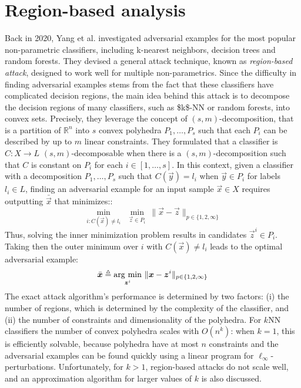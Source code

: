 \section {Region-based analysis}
\label{sec:region-analysis}

Back in 2020, Yang et al. \cite{YangRWC20} investigated adversarial examples for the most popular non-parametric classifiers, including k-nearest neighbors, decision trees and random forests. They devised a general attack technique, known as \emph{region-based attack}, designed to work well for multiple non-parametrics. Since the difficulty in finding adversarial examples stems from the fact that these classifiers have complicated decision regions, the main idea behind this attack is to decompose the decision regions of many classifiers, such as \acs{$k$-NN} or random forests, into convex sets. Precisely, they leverage the concept of $(s, m)$-decomposition, that is a partition of $\mathbb{R}^n$ into $s$ convex polyhedra $P_1,\dots,P_s$ such that each $P_i$ can be described by up to $m$ linear constraints. They formulated  that a classifier is $C\colon X \rightarrow L$ $(s, m)$-decomposable when there is a $(s, m)$-decomposition such that $C$ is constant on $P_i$ for each $i \in [1,\dots,s]$. In this context, given a classifier with a decomposition  $P_1,\dots,P_s$ such that $C(\vec{y}) = l_i$ when $\vec{y} \in P_i$ for labels $l_i \in L$, finding an adversarial example for an input sample $\vec{x} \in X$ requires outputting $\bar{\vec{x}}$ that minimizes::
\begin{equation*}
	\min\limits_{i\colon C(\vec{x}) \neq l_i} ~~ \min\limits_{\vec{z} \in P_i} ~ \lVert \vec{x} - \vec{z} \rVert_{p \in \{1, 2, \infty\}}
\end{equation*}
Thus, solving the inner minimization problem results in candidates $\vec{z}^i \in P_i$. Taking then the outer minimum over $i$ with $C(\vec{x}) \neq l_i$ leads to the optimal adversarial example:
\begin{equation*}
	\bar{\bm{x}} \triangleq \operatorname*{\arg\,\min}\limits_{\bm{z}^i} ~ \lVert \bm{x} - \bm{z}^i \rVert_{p \in \{1, 2, \infty\}}
\end{equation*}
The exact attack algorithm's performance is determined by two factors: (i) the number of regions, which is determined by the complexity of the classifier, and (ii) the number of constraints and dimensionality of the polyhedra. For $k$NN classifiers the number of convex polyhedra scales with $O(n^k)$: when $k = 1$, this is efficiently solvable, because polyhedra have at most $n$ constraints and the adversarial examples can be found quickly using a linear program for $\ell_\infty$-perturbations. Unfortunately, for $k > 1$, region-based attacks do not scale well, and an approximation algorithm for larger values of $k$ is also discussed.


